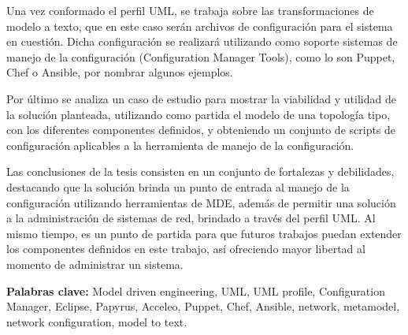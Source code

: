 Una vez conformado el perfil UML, se trabaja sobre las transformaciones de modelo a texto, que en este caso serán archivos de configuración para el sistema en cuestión. Dicha configuración se realizará utilizando como soporte sistemas de manejo de la configuración (Configuration Manager Tools), como lo son Puppet, Chef o Ansible, por nombrar algunos ejemplos.

Por último se analiza un caso de estudio para mostrar la viabilidad y utilidad de la solución planteada, utilizando como partida el modelo de una topología tipo, con los diferentes componentes definidos, y obteniendo un conjunto de scripts de configuración aplicables a la herramienta de manejo de la   configuración.

Las conclusiones de la tesis consisten en un conjunto de fortalezas y debilidades, destacando que la solución brinda un punto de entrada al manejo de la configuración utilizando herramientas de MDE, además de permitir una solución a la administración de sistemas de red, brindado a través del perfil UML. Al mismo tiempo, es un punto de partida para que futuros trabajos puedan extender los componentes definidos en este trabajo, así ofreciendo mayor libertad al momento de administrar un sistema.

\textbf{Palabras clave:} Model driven engineering, UML, UML profile, Configuration Manager, Eclipse, Papyrus, Acceleo, Puppet, Chef, Ansible, network, metamodel, network configuration, model to text.